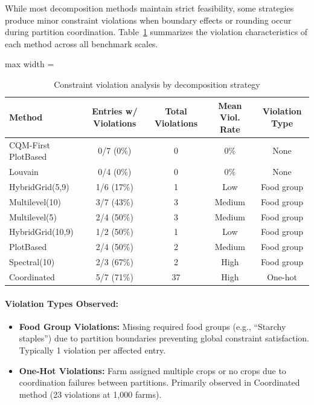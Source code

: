 While most decomposition methods maintain strict feasibility, some strategies produce minor constraint violations when boundary effects or rounding occur during partition coordination. Table~\ref{tab:violation_by_strategy} summarizes the violation characteristics of each method across all benchmark scales.

\begin{table}[H]
\centering
\caption{Constraint violation analysis by decomposition strategy}
\label{tab:violation_by_strategy}
\small
\begin{adjustbox}{max width = \textwidth}
    
\begin{tabular}{lcccc}
\toprule
\textbf{Method} & \textbf{Entries w/ Violations} & \textbf{Total Violations} & \textbf{Mean Viol. Rate} & \textbf{Violation Type} \\
\midrule
CQM-First PlotBased & 0/7 (0\%) & 0 & 0\% & None \\
Louvain & 0/4 (0\%) & 0 & 0\% & None \\
HybridGrid(5,9) & 1/6 (17\%) & 1 & Low & Food group \\
Multilevel(10) & 3/7 (43\%) & 3 & Medium & Food group \\
Multilevel(5) & 2/4 (50\%) & 3 & Medium & Food group \\
HybridGrid(10,9) & 1/2 (50\%) & 1 & Low & Food group \\
PlotBased & 2/4 (50\%) & 2 & Medium & Food group \\
Spectral(10) & 2/3 (67\%) & 2 & High & Food group \\
Coordinated & 5/7 (71\%) & 37 & High & One-hot \\
\bottomrule
\end{tabular}
\end{adjustbox}
\end{table}

\paragraph{Violation Types Observed:}
\begin{itemize}
    \item \textbf{Food Group Violations:} Missing required food groups (e.g., ``Starchy staples'') due to partition boundaries preventing global constraint satisfaction. Typically 1 violation per affected entry.
    \item \textbf{One-Hot Violations:} Farm assigned multiple crops or no crops due to coordination failures between partitions. Primarily observed in Coordinated method (23 violations at 1,000 farms).
\end{itemize}

